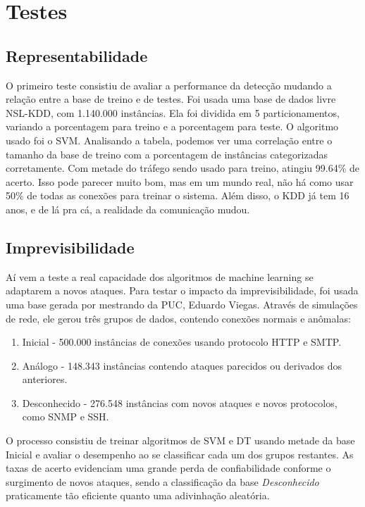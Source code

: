 \documentclass[12pt,a4paper]{article}
\begin{document}
\section{Testes}
    \subsection{Representabilidade}
    O primeiro teste consistiu de avaliar a performance da detecção mudando a relação entre a base de treino e de testes.
    Foi usada uma base de dados livre NSL-KDD, com 1.140.000 instâncias. Ela foi dividida em 5 particionamentos, variando
    a porcentagem para treino e a porcentagem para teste. O algoritmo usado foi o SVM.
    Analisando a tabela, podemos ver uma correlação entre o tamanho da base de treino com a porcentagem de instâncias
    categorizadas corretamente. Com metade do tráfego sendo usado para treino, atingiu 99.64\% de acerto.
    Isso pode parecer muito bom, mas em um mundo real, não há como usar 50\% de todas as conexões para treinar o sistema.
    Além disso, o KDD já tem 16 anos, e de lá pra cá, a realidade da comunicação mudou.

    \subsection{Imprevisibilidade}
    Aí vem a teste a real capacidade dos algoritmos de machine learning se adaptarem a novos ataques. Para testar o
    impacto da imprevisibilidade, foi usada uma base gerada por mestrando da PUC, Eduardo Viegas. Através de simulações de
    rede, ele gerou três grupos de dados, contendo conexões normais e anômalas:
    \begin{enumerate}
        \item Inicial - 500.000 instâncias de conexões usando protocolo HTTP e SMTP.
        \item Análogo - 148.343 instâncias contendo ataques parecidos ou derivados dos anteriores.
        \item Desconhecido - 276.548 instâncias com novos ataques e novos protocolos, como SNMP e SSH.
    \end{enumerate}

    O processo consistiu de treinar algoritmos de SVM e DT usando metade da base Inicial e avaliar o desempenho
     ao se classificar cada um dos grupos restantes. As taxas de acerto evidenciam uma grande perda de confiabilidade
     conforme o surgimento de novos ataques, sendo a classificação da base \textit{Desconhecido} praticamente tão
     eficiente quanto uma adivinhação aleatória.
\end{document}
